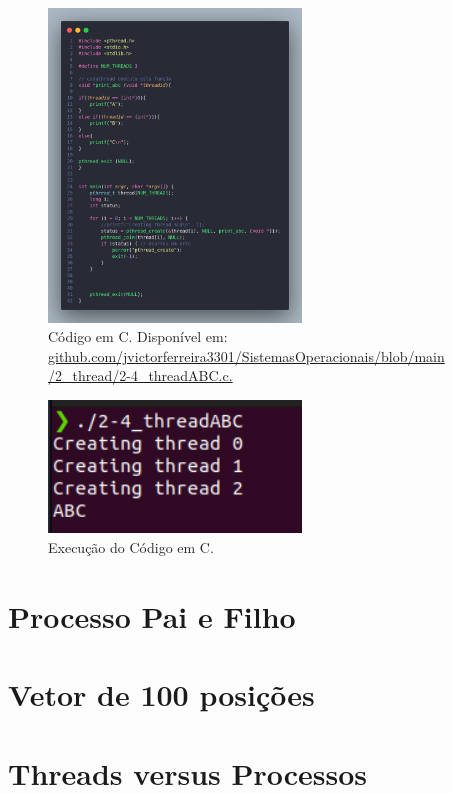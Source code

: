 \documentclass[
	12pt,				%
	openright,			%
	oneside,			%
	a4paper,			%
	chapter=TITLE,		%
	english,			%
	french,				%
	spanish,			%
	brazil				%
	]{abntex2}
\theoremstyle{definition}
\begin{document}
\begin{figure}
    \centering
    \includegraphics[width=0.6\textwidth]{imagens/processos_4.png}
	\caption{Código em C. Disponível em: \href{https://github.com/jvictorferreira3301/Sistemas_Operacionais/blob/main/2_thread/2-4_threadABC.c}{github.com/jvictorferreira3301/SistemasOperacionais/blob/main
    /2\_thread/2-4\_threadABC.c.}}
	\label{fig:processos4}
\end{figure}

\begin{figure}
    \centering
    \includegraphics[width=0.6\textwidth]{imagens/run_processos_4.png}
    \caption{Execução do Código em C.}
    \label{fig:run4}
\end{figure}
\section{Processo Pai e Filho}

\section{Vetor de 100 posições}

\section{Threads versus Processos}
\end{document}
